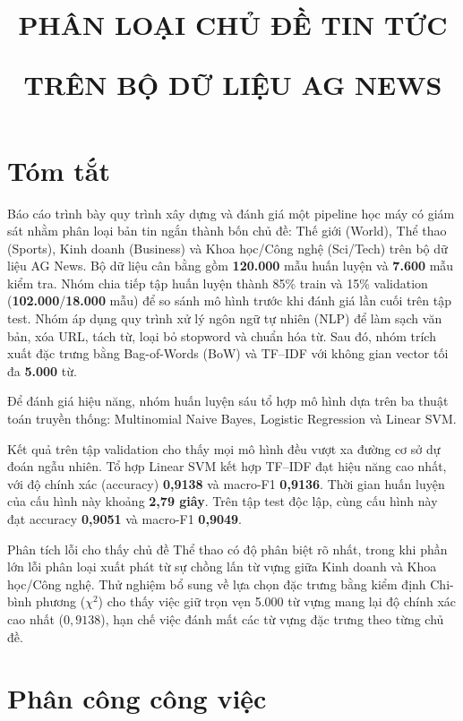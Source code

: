 \documentclass[12pt]{hcmut-report}
\title{%
  \parbox{\linewidth}{\centering
    PHÂN LOẠI CHỦ ĐỀ TIN TỨC\par
    TRÊN BỘ DỮ LIỆU AG NEWS\par
  }%
}
\author{}
\newcommand{\firstparagraph}{\noindent\hspace*{2em}}
\begin{document}
\coverpage

\clearpage
\tableofcontents

\clearpage
{}
\listoffigures

\clearpage
{}
\listoftables

\clearpage

\section*{Tóm tắt}

\firstparagraph Báo cáo trình bày quy trình xây dựng và đánh giá một pipeline học máy có giám sát nhằm phân loại bản tin ngắn thành bốn chủ đề: Thế giới (World), Thể thao (Sports), Kinh doanh (Business) và Khoa học/Công nghệ (Sci/Tech) trên bộ dữ liệu AG News. Bộ dữ liệu cân bằng gồm \textbf{120.000} mẫu huấn luyện và \textbf{7.600} mẫu kiểm tra. Nhóm chia tiếp tập huấn luyện thành 85\% train và 15\% validation (\textbf{102.000}/\textbf{18.000} mẫu) để so sánh mô hình trước khi đánh giá lần cuối trên tập test. Nhóm áp dụng quy trình xử lý ngôn ngữ tự nhiên (NLP) để làm sạch văn bản, xóa URL, tách từ, loại bỏ stopword và chuẩn hóa từ. Sau đó, nhóm trích xuất đặc trưng bằng Bag-of-Words (BoW) và TF--IDF với không gian vector tối đa \textbf{5.000} từ.

Để đánh giá hiệu năng, nhóm huấn luyện sáu tổ hợp mô hình dựa trên ba thuật toán truyền thống: Multinomial Naive Bayes, Logistic Regression và Linear SVM.

Kết quả trên tập validation cho thấy mọi mô hình đều vượt xa đường cơ sở dự đoán ngẫu nhiên. Tổ hợp Linear SVM kết hợp TF--IDF đạt hiệu năng cao nhất, với độ chính xác (accuracy) \textbf{0,9138} và macro-F1 \textbf{0,9136}. Thời gian huấn luyện của cấu hình này khoảng \textbf{2,79 giây}. Trên tập test độc lập, cùng cấu hình này đạt accuracy \textbf{0,9051} và macro-F1 \textbf{0,9049}.

Phân tích lỗi cho thấy chủ đề Thể thao có độ phân biệt rõ nhất, trong khi phần lớn lỗi phân loại xuất phát từ sự chồng lấn từ vựng giữa Kinh doanh và Khoa học/Công nghệ. Thử nghiệm bổ sung về lựa chọn đặc trưng bằng kiểm định Chi-bình phương ($\chi^2$) cho thấy việc giữ trọn vẹn 5.000 từ vựng mang lại độ chính xác cao nhất ($0{,}9138$), hạn chế việc đánh mất các từ vựng đặc trưng theo từng chủ đề.

\clearpage
\section*{Phân công công việc}
\end{document}
